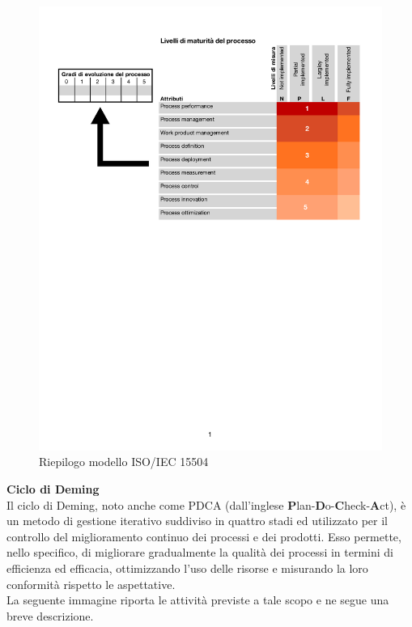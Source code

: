 \documentclass[11pt,a4paper]{article}
\begin{document}
{\begin{itemize}
\end{itemize}
\begin{figure}[htbp]
	\centering
	\includegraphics[scale=0.7]{images/ISOIEC15504.pdf}
	\caption{Riepilogo modello ISO/IEC 15504}
\end{figure}
\noindent
\textbf{Ciclo di Deming} \\
Il ciclo di Deming, noto anche come PDCA (dall'inglese \textbf{P}lan-\textbf{D}o-\textbf{C}heck-\textbf{A}ct), è un metodo di gestione iterativo suddiviso in quattro stadi ed utilizzato per il controllo del miglioramento continuo dei processi e dei prodotti. Esso permette, nello specifico, di migliorare gradualmente la qualità dei processi in termini di efficienza ed efficacia, ottimizzando l'uso delle risorse e misurando la loro conformità rispetto le aspettative. \\
La seguente immagine riporta le attività previste a tale scopo e ne segue una breve descrizione. 
\begin{figure}[htbp]
	\centering

\end{figure}}
\end{document}
